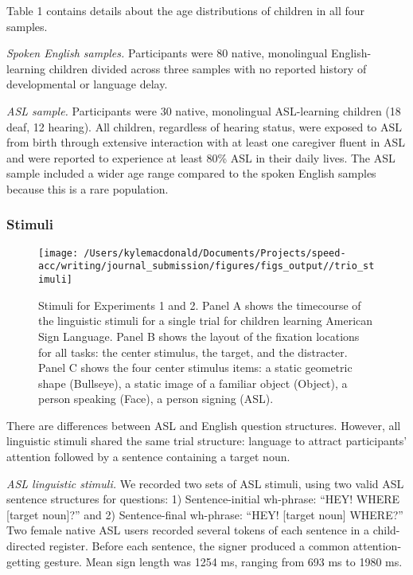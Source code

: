 \documentclass[,man,floatsintext]{apa6}
\begin{document}
Table 1 contains details about the age distributions of children in all
four samples.

\emph{Spoken English samples.} Participants were 80 native, monolingual
English-learning children divided across three samples with no reported
history of developmental or language delay.

\emph{ASL sample.} Participants were 30 native, monolingual ASL-learning
children (18 deaf, 12 hearing). All children, regardless of hearing
status, were exposed to ASL from birth through extensive interaction
with at least one caregiver fluent in ASL and were reported to
experience at least 80\% ASL in their daily lives. The ASL sample
included a wider age range compared to the spoken English samples
because this is a rare population.

\hypertarget{stimuli}{%
\subsubsection{Stimuli}\label{stimuli}}

\begin{figure}[!t]

{\centering \texttt{[image: /Users/kylemacdonald/Documents/Projects/speed-acc/writing/journal\_submission/figures/figs\_output//trio\_stimuli]} 

}

\caption{Stimuli for Experiments 1 and 2. Panel A shows the timecourse of the linguistic stimuli for a single trial for children learning American Sign Language. Panel B shows the layout of the fixation locations for all tasks: the center stimulus, the target, and the distracter. Panel C shows the four center stimulus items: a static geometric shape (Bullseye), a static image of a familiar object (Object), a person speaking (Face), a person signing (ASL).}\label{fig:trio-stim}
\end{figure}

There are differences between ASL and English question structures.
However, all linguistic stimuli shared the same trial structure:
language to attract participants' attention followed by a sentence
containing a target noun.

\emph{ASL linguistic stimuli.} We recorded two sets of ASL stimuli,
using two valid ASL sentence structures for questions: 1)
Sentence-initial wh-phrase: \enquote{HEY! WHERE {[}target noun{]}?} and
2) Sentence-final wh-phrase: \enquote{HEY! {[}target noun{]} WHERE?} Two
female native ASL users recorded several tokens of each sentence in a
child-directed register. Before each sentence, the signer produced a
common attention-getting gesture. Mean sign length was 1254 ms, ranging
from 693 ms to 1980 ms.
\end{document}
